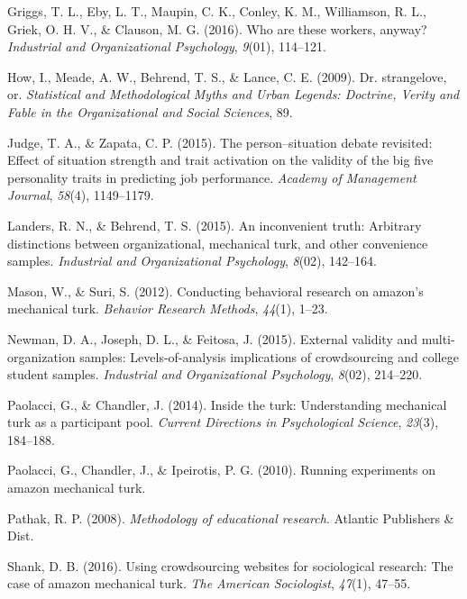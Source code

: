 \documentclass[english,man]{apa6}
\theoremstyle{definition}
\theoremstyle{definition}
\theoremstyle{remark}
\begin{document}
\hypertarget{ref-griggs2016these}{}
Griggs, T. L., Eby, L. T., Maupin, C. K., Conley, K. M., Williamson, R.
L., Griek, O. H. V., \& Clauson, M. G. (2016). Who are these workers,
anyway? \emph{Industrial and Organizational Psychology}, \emph{9}(01),
114--121.

\hypertarget{ref-how2009dr}{}
How, I., Meade, A. W., Behrend, T. S., \& Lance, C. E. (2009). Dr.
strangelove, or. \emph{Statistical and Methodological Myths and Urban
Legends: Doctrine, Verity and Fable in the Organizational and Social
Sciences}, 89.

\hypertarget{ref-judge2015person}{}
Judge, T. A., \& Zapata, C. P. (2015). The person--situation debate
revisited: Effect of situation strength and trait activation on the
validity of the big five personality traits in predicting job
performance. \emph{Academy of Management Journal}, \emph{58}(4),
1149--1179.

\hypertarget{ref-landers2015inconvenient}{}
Landers, R. N., \& Behrend, T. S. (2015). An inconvenient truth:
Arbitrary distinctions between organizational, mechanical turk, and
other convenience samples. \emph{Industrial and Organizational
Psychology}, \emph{8}(02), 142--164.

\hypertarget{ref-mason2012conducting}{}
Mason, W., \& Suri, S. (2012). Conducting behavioral research on
amazon's mechanical turk. \emph{Behavior Research Methods},
\emph{44}(1), 1--23.

\hypertarget{ref-newman2015external}{}
Newman, D. A., Joseph, D. L., \& Feitosa, J. (2015). External validity
and multi-organization samples: Levels-of-analysis implications of
crowdsourcing and college student samples. \emph{Industrial and
Organizational Psychology}, \emph{8}(02), 214--220.

\hypertarget{ref-paolacci2014inside}{}
Paolacci, G., \& Chandler, J. (2014). Inside the turk: Understanding
mechanical turk as a participant pool. \emph{Current Directions in
Psychological Science}, \emph{23}(3), 184--188.

\hypertarget{ref-paolacci2010running}{}
Paolacci, G., Chandler, J., \& Ipeirotis, P. G. (2010). Running
experiments on amazon mechanical turk.

\hypertarget{ref-pathak2008methodology}{}
Pathak, R. P. (2008). \emph{Methodology of educational research}.
Atlantic Publishers \& Dist.

\hypertarget{ref-shank2016using}{}
Shank, D. B. (2016). Using crowdsourcing websites for sociological
research: The case of amazon mechanical turk. \emph{The American
Sociologist}, \emph{47}(1), 47--55.
\end{document}
